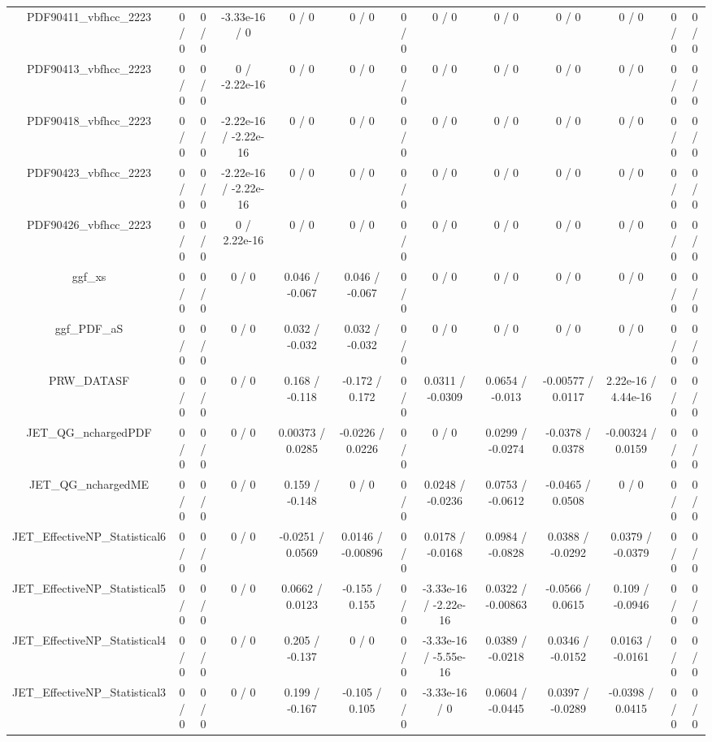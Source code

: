 \documentclass[10pt]{article}
\begin{document}
\begin{table}[htbp]
\begin{center}
\begin{tabular}{|c|c|c|c|c|c|c|c|c|c|c|c|c|}
  PDF90411_vbfhcc_2223 & 0 / 0 & 0 / 0 & -3.33e-16 / 0 & 0 / 0 & 0 / 0 & 0 / 0 & 0 / 0 & 0 / 0 & 0 / 0 & 0 / 0 & 0 / 0 & 0 / 0 \\ 
  PDF90413_vbfhcc_2223 & 0 / 0 & 0 / 0 & 0 / -2.22e-16 & 0 / 0 & 0 / 0 & 0 / 0 & 0 / 0 & 0 / 0 & 0 / 0 & 0 / 0 & 0 / 0 & 0 / 0 \\ 
  PDF90418_vbfhcc_2223 & 0 / 0 & 0 / 0 & -2.22e-16 / -2.22e-16 & 0 / 0 & 0 / 0 & 0 / 0 & 0 / 0 & 0 / 0 & 0 / 0 & 0 / 0 & 0 / 0 & 0 / 0 \\ 
  PDF90423_vbfhcc_2223 & 0 / 0 & 0 / 0 & -2.22e-16 / -2.22e-16 & 0 / 0 & 0 / 0 & 0 / 0 & 0 / 0 & 0 / 0 & 0 / 0 & 0 / 0 & 0 / 0 & 0 / 0 \\ 
  PDF90426_vbfhcc_2223 & 0 / 0 & 0 / 0 & 0 / 2.22e-16 & 0 / 0 & 0 / 0 & 0 / 0 & 0 / 0 & 0 / 0 & 0 / 0 & 0 / 0 & 0 / 0 & 0 / 0 \\ 
  ggf_xs & 0 / 0 & 0 / 0 & 0 / 0 & 0.046 / -0.067 & 0.046 / -0.067 & 0 / 0 & 0 / 0 & 0 / 0 & 0 / 0 & 0 / 0 & 0 / 0 & 0 / 0 \\ 
  ggf_PDF_aS & 0 / 0 & 0 / 0 & 0 / 0 & 0.032 / -0.032 & 0.032 / -0.032 & 0 / 0 & 0 / 0 & 0 / 0 & 0 / 0 & 0 / 0 & 0 / 0 & 0 / 0 \\ 
  PRW_DATASF & 0 / 0 & 0 / 0 & 0 / 0 & 0.168 / -0.118 & -0.172 / 0.172 & 0 / 0 & 0.0311 / -0.0309 & 0.0654 / -0.013 & -0.00577 / 0.0117 & 2.22e-16 / 4.44e-16 & 0 / 0 & 0 / 0 \\ 
  JET_QG_nchargedPDF & 0 / 0 & 0 / 0 & 0 / 0 & 0.00373 / 0.0285 & -0.0226 / 0.0226 & 0 / 0 & 0 / 0 & 0.0299 / -0.0274 & -0.0378 / 0.0378 & -0.00324 / 0.0159 & 0 / 0 & 0 / 0 \\ 
  JET_QG_nchargedME & 0 / 0 & 0 / 0 & 0 / 0 & 0.159 / -0.148 & 0 / 0 & 0 / 0 & 0.0248 / -0.0236 & 0.0753 / -0.0612 & -0.0465 / 0.0508 & 0 / 0 & 0 / 0 & 0 / 0 \\ 
  JET_EffectiveNP_Statistical6 & 0 / 0 & 0 / 0 & 0 / 0 & -0.0251 / 0.0569 & 0.0146 / -0.00896 & 0 / 0 & 0.0178 / -0.0168 & 0.0984 / -0.0828 & 0.0388 / -0.0292 & 0.0379 / -0.0379 & 0 / 0 & 0 / 0 \\ 
  JET_EffectiveNP_Statistical5 & 0 / 0 & 0 / 0 & 0 / 0 & 0.0662 / 0.0123 & -0.155 / 0.155 & 0 / 0 & -3.33e-16 / -2.22e-16 & 0.0322 / -0.00863 & -0.0566 / 0.0615 & 0.109 / -0.0946 & 0 / 0 & 0 / 0 \\ 
  JET_EffectiveNP_Statistical4 & 0 / 0 & 0 / 0 & 0 / 0 & 0.205 / -0.137 & 0 / 0 & 0 / 0 & -3.33e-16 / -5.55e-16 & 0.0389 / -0.0218 & 0.0346 / -0.0152 & 0.0163 / -0.0161 & 0 / 0 & 0 / 0 \\ 
  JET_EffectiveNP_Statistical3 & 0 / 0 & 0 / 0 & 0 / 0 & 0.199 / -0.167 & -0.105 / 0.105 & 0 / 0 & -3.33e-16 / 0 & 0.0604 / -0.0445 & 0.0397 / -0.0289 & -0.0398 / 0.0415 & 0 / 0 & 0 / 0 \\ 

\end{tabular}
\end{center}
\end{table}
\end{document}
